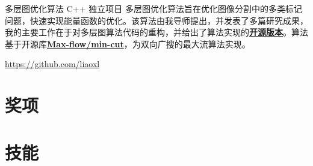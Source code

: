 \documentclass[11pt,a4paper,sans]{moderncv}   %
\begin{document}
\begin{CJK}{UTF8}{gbsn}
{多层图优化算法}
{C++}
{独立项目}{}
{多层图优化算法旨在优化图像分割中的多类标记问题，快速实现能量函数的优化。该算法由我导师提出，并发表了多篇研究成果，我的主要工作在于对多层图算法代码的重构，并给出了算法实现的\textbf{\href{https://github.com/liaoxl/MultiLayerGraph}{开源版本}}。算法基于开源库\textbf{\href{http://vision.csd.uwo.ca/code/}{Max-flow/min-cut}}，为双向广搜的最大流算法实现。}
\vspace*{0.2\baselineskip}

{\href{https://github.com/liaoxl}{https://github.com/liaoxl}}
{}{}{}{}


\renewcommand{\baselinestretch}{1.0}

\section{奖项}

\section{技能}


\closesection{}                   %
\renewcommand{\listitemsymbol}{-} %
\clearpage\end{CJK}
\end{document}
